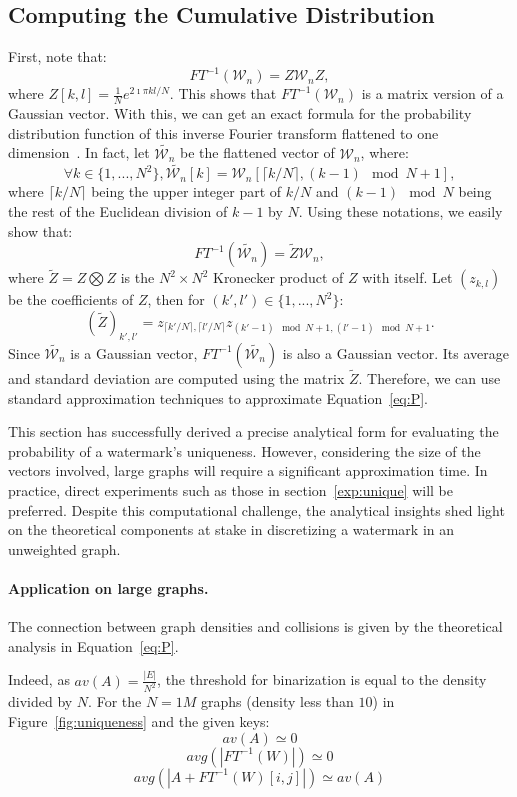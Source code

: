 \subsection{Computing the Cumulative Distribution}
\label{sec:distortion}
First, note that:
$$FT^{-1}(\mathcal{W}_{n}) = Z \mathcal{W}_{n} Z,$$
where $Z[k,l] = \frac{1}{N}e^{2\imath\pi kl/N}$. This shows that $FT^{-1}(\mathcal{W}_n)$ is a matrix version of a Gaussian vector. With this, we can get an exact formula for the probability distribution function of this inverse Fourier transform flattened to one dimension~\cite{zdvi}.
In fact, let $\tilde{\mathcal{W}_{n}}$ be the flattened vector of $\mathcal{W}_{n}$, where:
$$
\forall k \in \{1,...,N^2\}, \tilde{\mathcal{W}_{n}}[k] = \mathcal{W}_{n}[\lceil k/N \rceil ,(k-1) \mod N+1],
$$
where $\lceil k/N \rceil$ being the upper integer part of $k/N$ and $(k-1) \mod N$ being the rest of the Euclidean division of $k-1$ by $N$. Using these notations, we easily show that:
$$FT^{-1}(\tilde{\mathcal{W}_{n}}) = \tilde{Z} \mathcal{W}_{n},$$
where $\tilde{Z} = Z \bigotimes Z$ is the $N^2 \times N^2$ Kronecker product of $Z$ with itself. Let $(z_{k,l})$ be the coefficients of $Z$, then for $(k',l') \in \{1,...,N^2\}$:
$$
(\tilde{Z})_{k', l'} = z_{\lceil k' /N\rceil , \lceil l' /N\rceil} z_{(k'-1) \mod N+1, (l'-1) \mod N+1}.
$$
Since $\tilde{\mathcal{W}_{n}}$ is a Gaussian vector, $FT^{-1}(\tilde{\mathcal{W}_{n}})$ is also a Gaussian vector. Its average and standard deviation are computed using the matrix $\tilde{Z}$. Therefore, we can use standard approximation techniques to approximate Equation~\eqref{eq:P}. 

This section has successfully derived a precise analytical form for evaluating the probability of a watermark's uniqueness. However, considering the size of the vectors involved, large graphs will require a significant approximation time. In practice, direct experiments such as those in section~\ref{exp:unique} will be preferred. Despite this computational challenge, the analytical insights shed light on the theoretical components at stake in discretizing a watermark in an unweighted graph.

\paragraph{Application on large graphs.} The connection between graph densities and collisions is given by the theoretical analysis in Equation~\eqref{eq:P}. 

Indeed, as $av(A) = \frac{|E|}{N^2}$, the threshold for binarization is equal to the density divided by $N$. For the $N=1M$ graphs (density less than $10$) in Figure~\ref{fig:uniqueness} and the given keys:
$$av(A) \simeq 0$$
$$avg(|FT^{-1}(W)|) \simeq 0$$
$$avg(|A+FT^{-1}(W)[i,j]|) \simeq av(A)$$


